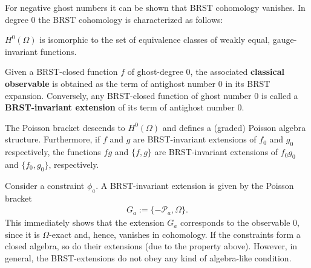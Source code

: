     For negative ghost numbers it can be shown that BRST cohomology vanishes. In degree 0 the BRST cohomology is characterized as follows:
    \begin{property}\label{constraint:brst_0}
        $H^0(\Omega)$ is isomorphic to the set of equivalence classes of weakly equal, gauge-invariant functions.

        Given a BRST-closed function $f$ of ghost-degree 0, the associated \textbf{classical observable} is obtained as the term of antighost number 0 in its BRST expansion. Conversely, any BRST-closed function of ghost number 0 is called a \textbf{BRST-invariant extension} of its term of antighost number 0.
    \end{property}
    \begin{property}
        The Poisson bracket descends to $H^0(\Omega)$ and defines a (graded) Poisson algebra structure. Furthermore, if $f$ and $g$ are BRST-invariant extensions of $f_0$ and $g_0$ respectively, the functions $fg$ and $\{f,g\}$ are BRST-invariant extensions of $f_0g_0$ and $\{f_0,g_0\}$, respectively.
    \end{property}

    \begin{example}
        Consider a constraint $\phi_a$. A BRST-invariant extension is given by the Poisson bracket
        \begin{gather}
            G_a := \{-\mathcal{P}_a,\Omega\}.
        \end{gather}
        This immediately shows that the extension $G_a$ corresponds to the observable 0, since it is $\Omega$-exact and, hence, vanishes in cohomology. If the constraints form a closed algebra, so do their extensions (due to the property above). However, in general, the BRST-extensions do not obey any kind of algebra-like condition.
    \end{example}



